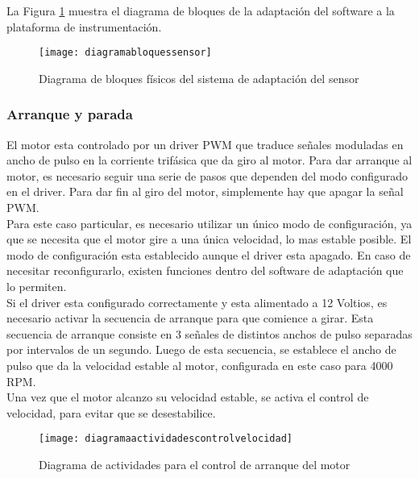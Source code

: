 La Figura \ref{fig:diagramabloquessensor} muestra el diagrama de bloques de la adaptación del software a la plataforma de instrumentación.

\begin{figure}[h]
  \centering
  \texttt{[image: diagramabloquessensor]}
  \caption{Diagrama de bloques físicos del sistema de adaptación del sensor}\label{fig:diagramabloquessensor}
\end{figure}

\subsubsection{Arranque y parada} %
\label{it6:ssub:arranque_y_parada}

El motor esta controlado por un driver PWM que traduce señales moduladas en ancho de pulso en la corriente trifásica que da giro al motor. Para dar arranque al motor, es necesario seguir una serie de pasos que dependen del modo configurado en el driver. Para dar fin al giro del motor, simplemente hay que apagar la señal PWM. \\

Para este caso particular, es necesario utilizar un único modo de configuración, ya que se necesita que el motor gire a una única velocidad, lo mas estable posible. El modo de configuración esta establecido aunque el driver esta apagado. En caso de necesitar reconfigurarlo, existen funciones dentro del software de adaptación que lo permiten. \\

Si el driver esta configurado correctamente y esta alimentado a 12 Voltios, es necesario activar la secuencia de arranque para que comience a girar. Esta secuencia de arranque consiste en 3 señales de distintos anchos de pulso separadas por intervalos de un segundo. Luego de esta secuencia, se establece el ancho de pulso que da la velocidad estable al motor, configurada en este caso para 4000 RPM. \\

Una vez que el motor alcanzo su velocidad estable, se activa el control de velocidad, para evitar que se desestabilice. 

\begin{figure}[h]
  \centering
  \texttt{[image: diagramaactividadescontrolvelocidad]}
  \caption{Diagrama de actividades para el control de arranque del motor}\label{fig:diagramaactividadesarrancarmotor}
\end{figure}

